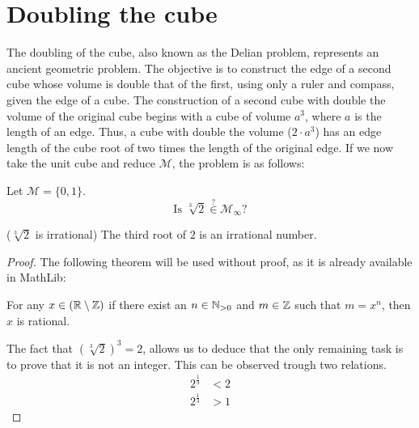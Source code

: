 \section{Doubling the cube}
The doubling of the cube, also known as the Delian problem, represents an ancient geometric problem.
The objective is to construct the edge of a second cube whose volume is double that of the first, using only a ruler and compass, given the edge of a cube.
The construction of a second cube with double the volume of the original cube begins with a cube of volume $a^3$, where $a$ is the length of an edge. 
Thus, a cube with double the volume ($2\cdot a^3$) has an edge length of the cube root of two times the length of the original edge.
If we now take the unit cube and reduce $\mathcal{M}$, the problem is as follows:
\begin{problem}
    Let $\mathcal{M} = \{0,1\}$.  
    $$\text{Is }\sqrt[3]{2} \overset{?}{\in} \mathcal{M}_{\infty}?$$
\end{problem}

\begin{lemma}($\sqrt[3]{2}$ is irrational)
    \label{lem:irrational_thirdroot_two}
    \leanok
    The third root of $2$ is an irrational number.
\end{lemma}
\begin{proof}
    \leanok
    The following theorem will be used without proof, as it is already available in MathLib:
    \begin{theorem*}
        For any $x\in(\mathbb{R}\setminus\mathbb{Z})$ if there exist an $n\in \mathbb{N}_{>0}$ and $m\in\mathbb{Z}$ such that $m = x^n$, then $x$ is rational. 
    \end{theorem*}
    The fact that $(\sqrt[3]{2})^3=2$, allows us to deduce that the only remaining task is to prove that it  is not an integer. 
    This can be observed trough two relations.
    \begin{align}
        2^{\frac{1}{3}} &< 2 \\
        2^{\frac{1}{3}} &> 1
    \end{align}
\end{proof}

